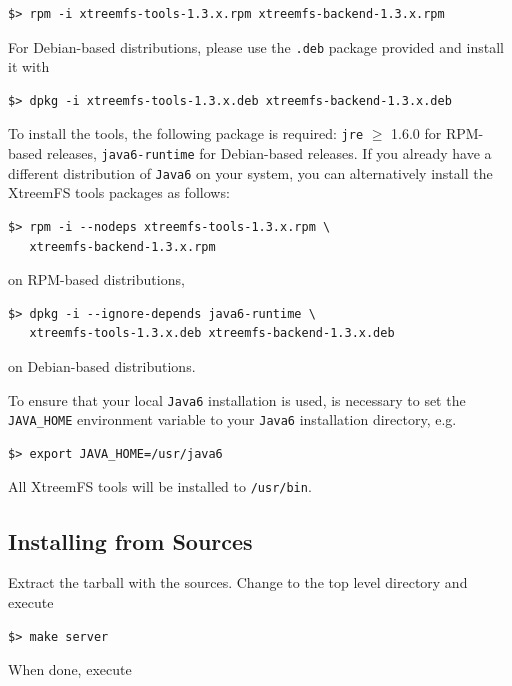 \documentclass[a4paper,10pt]{book}
\begin{document}
\begin{verbatim}
$> rpm -i xtreemfs-tools-1.3.x.rpm xtreemfs-backend-1.3.x.rpm
\end{verbatim}


For Debian-based distributions, please use the \texttt{.deb} package provided and install it with

\begin{verbatim}
$> dpkg -i xtreemfs-tools-1.3.x.deb xtreemfs-backend-1.3.x.deb
\end{verbatim}

To install the tools, the following package is required: \texttt{jre} $\geq$ 1.6.0 for RPM-based releases, \texttt{java6-runtime} for Debian-based releases. If you already have a different distribution of \texttt{Java6} on your system, you can alternatively install the XtreemFS tools packages as follows:

\begin{verbatim}
$> rpm -i --nodeps xtreemfs-tools-1.3.x.rpm \
   xtreemfs-backend-1.3.x.rpm
\end{verbatim}

on RPM-based distributions,

\begin{verbatim}
$> dpkg -i --ignore-depends java6-runtime \
   xtreemfs-tools-1.3.x.deb xtreemfs-backend-1.3.x.deb
\end{verbatim}

on Debian-based distributions.

To ensure that your local \texttt{Java6} installation is used, is necessary to set the \texttt{JAVA\_HOME} environment variable to your \texttt{Java6} installation directory, e.g.\

\begin{verbatim}
$> export JAVA_HOME=/usr/java6
\end{verbatim}


All XtreemFS tools will be installed to \texttt{/usr/bin}.

\subsection{Installing from Sources}

Extract the tarball with the sources. Change to the top level directory and execute

\begin{verbatim}
$> make server
\end{verbatim}

When done, execute
\end{document}
